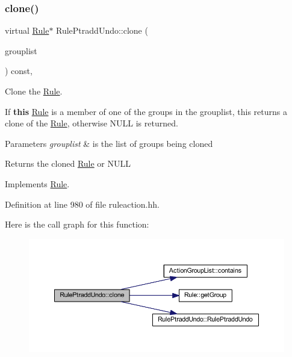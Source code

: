 \subsubsection{\texorpdfstring{clone()}{clone()}}
{\footnotesize\ttfamily virtual \mbox{\hyperlink{class_rule}{Rule}}$\ast$ Rule\+Ptradd\+Undo\+::clone (\begin{DoxyParamCaption}\item[{const \mbox{\hyperlink{class_action_group_list}{Action\+Group\+List}} \&}]{grouplist }\end{DoxyParamCaption}) const\hspace{0.3cm}{\ttfamily [inline]}, {\ttfamily [virtual]}}



Clone the \mbox{\hyperlink{class_rule}{Rule}}. 

If {\bfseries{this}} \mbox{\hyperlink{class_rule}{Rule}} is a member of one of the groups in the grouplist, this returns a clone of the \mbox{\hyperlink{class_rule}{Rule}}, otherwise N\+U\+LL is returned. 
\begin{DoxyParams}{Parameters}
{\em grouplist} & is the list of groups being cloned \\
\hline
\end{DoxyParams}
\begin{DoxyReturn}{Returns}
the cloned \mbox{\hyperlink{class_rule}{Rule}} or N\+U\+LL 
\end{DoxyReturn}


Implements \mbox{\hyperlink{class_rule_a70de90a76461bfa7ea0b575ce3c11e4d}{Rule}}.



Definition at line 980 of file ruleaction.\+hh.

Here is the call graph for this function\+:
\nopagebreak
\begin{figure}[H]
\begin{center}
\leavevmode
\includegraphics[width=350pt]{class_rule_ptradd_undo_a1838c48328cbd127036ec498a66d8989_cgraph}
\end{center}
\end{figure}
\mbox{\label{class_rule_ptradd_undo_a49b2fbf377a4e588627ec1fe6ccecc95}} 
